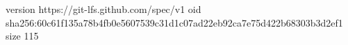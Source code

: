version https://git-lfs.github.com/spec/v1
oid sha256:60c61f135a78b4fb0e5607539c31d1c07ad22eb92ca7e75d422b68303b3d2ef1
size 115
